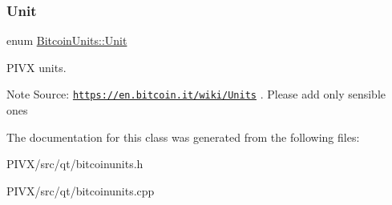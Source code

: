 \subsubsection{\texorpdfstring{Unit}{Unit}}
{\footnotesize\ttfamily enum \mbox{\hyperlink{class_bitcoin_units_ae41018ba530b4c8bdc74fd163709fb9d}{Bitcoin\+Units\+::\+Unit}}}

P\+I\+VX units. \begin{DoxyNote}{Note}
Source\+: \href{https://en.bitcoin.it/wiki/Units}{\tt https\+://en.\+bitcoin.\+it/wiki/\+Units} . Please add only sensible ones 
\end{DoxyNote}


The documentation for this class was generated from the following files\+:\begin{DoxyCompactItemize}
\item 
P\+I\+V\+X/src/qt/bitcoinunits.\+h\item 
P\+I\+V\+X/src/qt/bitcoinunits.\+cpp\end{DoxyCompactItemize}

